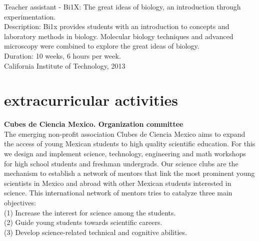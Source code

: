 \documentclass[]{friggeri-cv}
\begin{document}
Teacher assistant - Bi1X: The great ideas of biology, an introduction through experimentation.\\
Description: Bi1x provides students with an introduction to concepts and laboratory methods in biology. Molecular biology techniques and advanced microscopy were combined to explore the great ideas of biology.\\
Duration: 10 weeks, 6 hours per week.\\
{California Institute of Technology, 2013}\\

\section{extracurricular activities}
\textbf{Cubes de Ciencia Mexico. Organization committee}\\
The emerging non-profit association Clubes de Ciencia Mexico aims to expand the access of young Mexican students to high quality scientific education. For this we design and implement science, technology, engineering and math workshops for high school students and freshman undergrads. Our science clubs are the mechanism to establish a network of mentors that link the most prominent young scientists in Mexico and abroad with other Mexican students interested in science. This international network of mentors tries to catalyze three main objectives:\\
(1) Increase the interest for science among the students.\\
(2) Guide young students towards scientific careers.\\
(3) Develop science-related technical and cognitive abilities.
\end{document}
